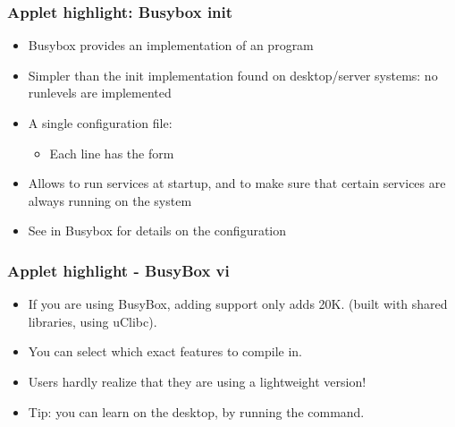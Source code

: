 \begin{frame}
  \frametitle{Applet highlight: Busybox init}
  \begin{itemize}
  \item Busybox provides an implementation of an  program
  \item Simpler than the init implementation found on desktop/server
    systems: no runlevels are implemented
  \item A single configuration file: 
    \begin{itemize}
    \item Each line has the form 
    \end{itemize}
  \item Allows to run services at startup, and to make sure that
    certain services are always running on the system
  \item See  in Busybox for details on the
    configuration
  \end{itemize}
\end{frame}

\begin{frame}
  \frametitle{Applet highlight - BusyBox vi}
  \begin{itemize}
  \item If you are using BusyBox, adding  support only adds
    20K. (built with shared libraries, using uClibc).
  \item You can select which exact features to compile in.
  \item Users hardly realize that they are using a lightweight 
    version!
  \item Tip: you can learn  on the desktop, by running the 
    command.
  \end{itemize}
\end{frame}

